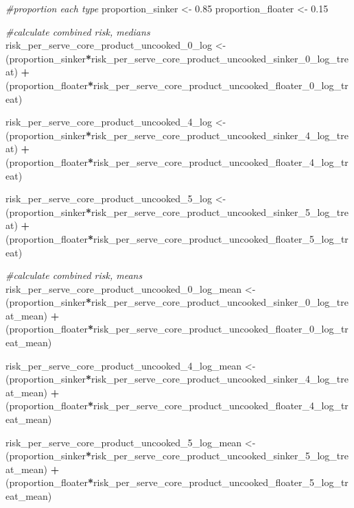 \documentclass[
]{article}
\newenvironment{Shaded}{\begin{snugshade}}{\end{snugshade}}
\newcommand{\CommentTok}[1]{\textcolor[rgb]{0.56,0.35,0.01}{\textit{#1}}}
\newcommand{\FloatTok}[1]{\textcolor[rgb]{0.00,0.00,0.81}{#1}}
\newcommand{\NormalTok}[1]{#1}
\newcommand{\OtherTok}[1]{\textcolor[rgb]{0.56,0.35,0.01}{#1}}
\newcommand{\SpecialCharTok}[1]{\textcolor[rgb]{0.81,0.36,0.00}{\textbf{#1}}}
\begin{document}
\begin{Shaded}
\begin{Highlighting}[]
\CommentTok{\#proportion each type}
\NormalTok{proportion\_sinker }\OtherTok{\textless{}{-}} \FloatTok{0.85}
\NormalTok{proportion\_floater }\OtherTok{\textless{}{-}} \FloatTok{0.15}

\CommentTok{\#calculate combined risk, medians}
\NormalTok{risk\_per\_serve\_core\_product\_uncooked\_0\_log }\OtherTok{\textless{}{-}}\NormalTok{ (proportion\_sinker}\SpecialCharTok{*}\NormalTok{risk\_per\_serve\_core\_product\_uncooked\_sinker\_0\_log\_treat) }\SpecialCharTok{+}\NormalTok{ (proportion\_floater}\SpecialCharTok{*}\NormalTok{risk\_per\_serve\_core\_product\_uncooked\_floater\_0\_log\_treat)}

\NormalTok{risk\_per\_serve\_core\_product\_uncooked\_4\_log }\OtherTok{\textless{}{-}}\NormalTok{ (proportion\_sinker}\SpecialCharTok{*}\NormalTok{risk\_per\_serve\_core\_product\_uncooked\_sinker\_4\_log\_treat) }\SpecialCharTok{+}\NormalTok{ (proportion\_floater}\SpecialCharTok{*}\NormalTok{risk\_per\_serve\_core\_product\_uncooked\_floater\_4\_log\_treat)}

\NormalTok{risk\_per\_serve\_core\_product\_uncooked\_5\_log }\OtherTok{\textless{}{-}}\NormalTok{ (proportion\_sinker}\SpecialCharTok{*}\NormalTok{risk\_per\_serve\_core\_product\_uncooked\_sinker\_5\_log\_treat) }\SpecialCharTok{+}\NormalTok{ (proportion\_floater}\SpecialCharTok{*}\NormalTok{risk\_per\_serve\_core\_product\_uncooked\_floater\_5\_log\_treat)}

\CommentTok{\#calculate combined risk, means}
\NormalTok{risk\_per\_serve\_core\_product\_uncooked\_0\_log\_mean }\OtherTok{\textless{}{-}}\NormalTok{ (proportion\_sinker}\SpecialCharTok{*}\NormalTok{risk\_per\_serve\_core\_product\_uncooked\_sinker\_0\_log\_treat\_mean) }\SpecialCharTok{+}\NormalTok{ (proportion\_floater}\SpecialCharTok{*}\NormalTok{risk\_per\_serve\_core\_product\_uncooked\_floater\_0\_log\_treat\_mean)}

\NormalTok{risk\_per\_serve\_core\_product\_uncooked\_4\_log\_mean }\OtherTok{\textless{}{-}}\NormalTok{ (proportion\_sinker}\SpecialCharTok{*}\NormalTok{risk\_per\_serve\_core\_product\_uncooked\_sinker\_4\_log\_treat\_mean) }\SpecialCharTok{+}\NormalTok{ (proportion\_floater}\SpecialCharTok{*}\NormalTok{risk\_per\_serve\_core\_product\_uncooked\_floater\_4\_log\_treat\_mean)}

\NormalTok{risk\_per\_serve\_core\_product\_uncooked\_5\_log\_mean }\OtherTok{\textless{}{-}}\NormalTok{ (proportion\_sinker}\SpecialCharTok{*}\NormalTok{risk\_per\_serve\_core\_product\_uncooked\_sinker\_5\_log\_treat\_mean) }\SpecialCharTok{+}\NormalTok{ (proportion\_floater}\SpecialCharTok{*}\NormalTok{risk\_per\_serve\_core\_product\_uncooked\_floater\_5\_log\_treat\_mean)}
\end{Highlighting}
\end{Shaded}
\end{document}
